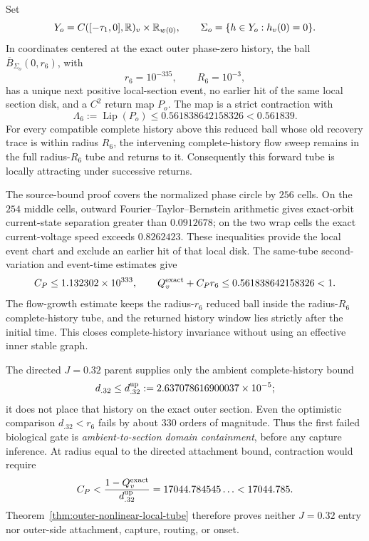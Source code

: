 \begin{theorem}
\label{thm:outer-nonlinear-local-tube}
Set
\[
 Y_o=C([-\tau_1,0],\mathbb R)_v\times\mathbb R_{w(0)},
 \qquad \Sigma_o=\{h\in Y_o:h_v(0)=0\}.
\]
In coordinates centered at the exact outer phase-zero history, the ball
\(\overline B_{\Sigma_o}(0,r_6)\), with
\[
 r_6=10^{-335},\qquad R_6=10^{-3},
\]
has a unique next positive local-section event, no earlier hit of the same
local section disk, and a \(C^2\) return map \(P_o\).  The map is a strict
contraction with
\begin{equation}
 \Lambda_6:=\operatorname{Lip}(P_o)
 \le0.561838642158326<0.561839.                         \label{eq:stage6a-lipschitz}
\end{equation}
For every compatible complete history above this reduced ball whose old
recovery trace is within radius \(R_6\), the intervening complete-history
flow sweep remains in the full radius-\(R_6\) tube and returns to it.
Consequently this forward tube is locally attracting under successive
returns.
\end{theorem}

The source-bound proof covers the normalized phase circle by \(256\) cells.
On the \(254\) middle cells, outward Fourier--Taylor--Bernstein arithmetic
gives exact-orbit current-state separation greater than \(0.0912678\); on
the two wrap cells the exact current-voltage speed exceeds \(0.8262423\).
These inequalities provide the local event chart and exclude an earlier hit
of that local disk.  The same-tube second-variation and event-time estimates
give
\[
 C_P\le1.132302\times10^{333},
 \qquad
 Q_v^{\rm exact}+C_Pr_6
 \le0.561838642158326<1.
\]
The flow-growth estimate keeps the radius-\(r_6\) reduced ball inside the
radius-\(R_6\) complete-history tube, and the returned history window lies
strictly after the initial time.  This closes complete-history invariance
without using an effective inner stable graph.

The directed \(J=0.32\) parent supplies only the ambient complete-history
bound
\[
 d_{.32}\le d_{.32}^{\rm up}
 :=2.637078616900037\times10^{-5};
\]
it does not place that history on the exact outer section.  Even the
optimistic comparison \(d_{.32}<r_6\) fails by about \(330\) orders of
magnitude.  Thus the first failed biological gate is
\emph{ambient-to-section domain containment}, before any capture inference.
At radius equal to the directed attachment bound, contraction would require
\begin{equation}
 C_P<\frac{1-Q_v^{\rm exact}}{d_{.32}^{\rm up}}
 =17044.784545\ldots<17044.785.                       \label{eq:stage6b-cp-target}
\end{equation}
Theorem~\ref{thm:outer-nonlinear-local-tube} therefore proves neither
\(J=0.32\) entry nor outer-side attachment, capture, routing, or onset.

